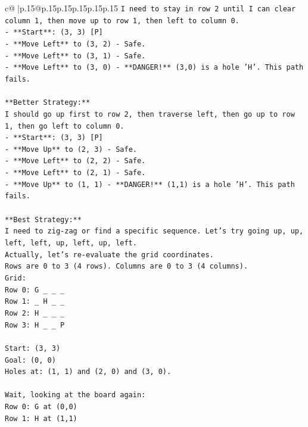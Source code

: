 \documentclass{article}
\begin{document}
{\begin{supertabular}{c@{$\;$}|p{.15\linewidth}@{}p{.15\linewidth}p{.15\linewidth}p{.15\linewidth}p{.15\linewidth}p{.15\linewidth}}
{{{\texttt{I need to stay in row 2 until I can clear column 1, then move up to row 1, then left to column 0.} \\
\texttt{{-} **Start**: (3, 3) {[}P{]}} \\
\texttt{{-} **Move Left** to (3, 2) {-} Safe.} \\
\texttt{{-} **Move Left** to (3, 1) {-} Safe.} \\
\texttt{{-} **Move Left** to (3, 0) {-} **DANGER!** (3,0) is a hole 'H'. This path fails.} \\
\\ 
\texttt{**Better Strategy:**} \\
\texttt{I should go up first to row 2, then traverse left, then go up to row 1, then go left to column 0.} \\
\texttt{{-} **Start**: (3, 3) {[}P{]}} \\
\texttt{{-} **Move Up** to (2, 3) {-} Safe.} \\
\texttt{{-} **Move Left** to (2, 2) {-} Safe.} \\
\texttt{{-} **Move Left** to (2, 1) {-} Safe.} \\
\texttt{{-} **Move Up** to (1, 1) {-} **DANGER!** (1,1) is a hole 'H'. This path fails.} \\
\\ 
\texttt{**Best Strategy:**} \\
\texttt{I need to zig{-}zag or find a specific sequence. Let's try going up, up, left, left, up, left, up, left.} \\
\texttt{Actually, let's re{-}evaluate the grid coordinates.} \\
\texttt{Rows are 0 to 3 (4 rows). Columns are 0 to 3 (4 columns).} \\
\texttt{Grid:} \\
\texttt{Row 0: G \_ \_ \_} \\
\texttt{Row 1: \_ H \_ \_} \\
\texttt{Row 2: H \_ \_ \_} \\
\texttt{Row 3: H \_ \_ P} \\
\\ 
\texttt{Start: (3, 3)} \\
\texttt{Goal: (0, 0)} \\
\texttt{Holes at: (1, 1) and (2, 0) and (3, 0).} \\
\\ 
\texttt{Wait, looking at the board again:} \\
\texttt{Row 0: G at (0,0)} \\
\texttt{Row 1: H at (1,1)} \\
}}}
\end{supertabular}}
\end{document}
